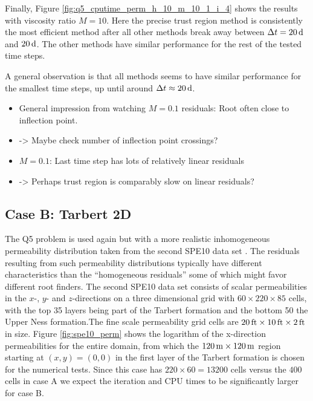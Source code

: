 Finally, Figure \ref{fig:q5_cputime_perm_h_10_m_10_1_i_4} shows the results with viscosity ratio $M = 10$. Here the precise trust region method is consistently the most efficient method after all other methods break away between $\Delta t = \unit[20]{d}$ and $\unit[20]{d}$. The other methods have similar performance for the rest of the tested time steps.

A general observation is that all methods seems to have similar performance for the smallest time steps, up until around $\Delta t \approx \unit[20]{d}$.

\begin{itemize}
\item General impression from watching $M=0.1$ residuals: Root often close to inflection point.
\item -> Maybe check number of inflection point crossings?
\item $M=0.1$: Last time step has lots of relatively linear residuals
\item -> Perhaps trust region is comparably slow on linear residuals?
\end{itemize}







\clearpage
\subsection{Case B: Tarbert 2D}
\label{section:caseB}
The Q5 problem is used again but with a more realistic inhomogeneous permeability distribution taken from the second SPE10 data set \citep{spe10_2000}. The residuals resulting from such permeability distributions typically have different characteristics than the ``homogeneous residuals'' some of which might favor different root finders. The second SPE10 data set consists of scalar permeabilities in the $x$-, $y$- and $z$-directions on a three dimensional grid with $60\times 220\times 85$ cells, with the top 35 layers being part of the Tarbert formation and the bottom 50 the Upper Ness formation.The fine scale permeability grid cells are $\unit[20]{ft}\times \unit[10]{ft}\times \unit[2]{ft}$ in size. Figure \ref{fig:spe10_perm} shows the logarithm of the x-direction permeabilities for the entire domain, from which the $\unit[120]{m}\times \unit[120]{m}$ region starting at $(x,y) = (0,0)$ in the first layer of the Tarbert formation is chosen for the numerical tests. Since this case has $220\times 60 = 13200$ cells versus the $400$ cells in case A we expect the iteration and CPU times to be significantly larger for case B.


